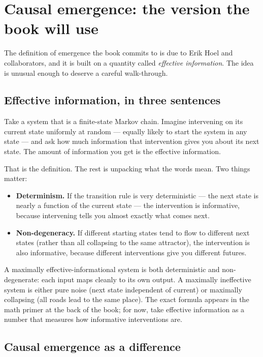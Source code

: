 \section{Causal emergence: the version the book will use}

The definition of emergence the book commits to is due to Erik Hoel and
collaborators, and it is built on a quantity called \emph{effective
information}. The idea is unusual enough to deserve a careful
walk-through.

\subsection*{Effective information, in three sentences}

Take a system that is a finite-state Markov chain. Imagine intervening on
its current state uniformly at random --- equally likely to start the
system in any state --- and ask how much information that intervention
gives you about its next state. The amount of information you get is the
effective information.

That is the definition. The rest is unpacking what the words mean. Two
things matter:

\begin{itemize}[leftmargin=1.5em,itemsep=2pt]
  \item \textbf{Determinism.} If the transition rule is very deterministic
    --- the next state is nearly a function of the current state --- the
    intervention is informative, because intervening tells you almost
    exactly what comes next.
  \item \textbf{Non-degeneracy.} If different starting states tend to
    flow to different next states (rather than all collapsing to the
    same attractor), the intervention is also informative, because
    different interventions give you different futures.
\end{itemize}

A maximally effective-informational system is both deterministic and
non-degenerate: each input maps cleanly to its own output. A maximally
ineffective system is either pure noise (next state independent of
current) or maximally collapsing (all roads lead to the same place). The
exact formula appears in the math primer at the back of the book; for
now, take effective information as a number that measures how
informative interventions are.

\subsection*{Causal emergence as a difference}

